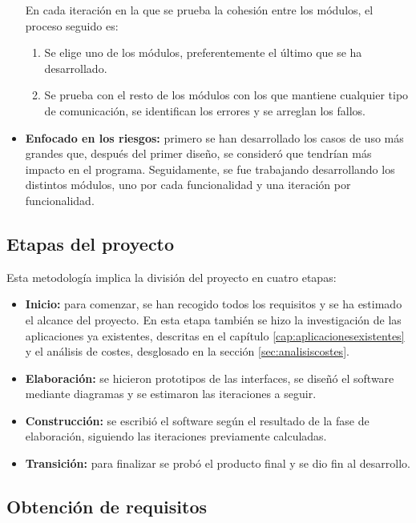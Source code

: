 \begin{itemize}
	En cada iteración en la que se prueba la cohesión entre los módulos, el proceso seguido es:
	\begin{enumerate}
		\item Se elige uno de los módulos, preferentemente el último que se ha desarrollado.
		\item Se prueba con el resto de los módulos con los que mantiene cualquier tipo de comunicación, se identifican los errores y se arreglan los fallos.
	\end{enumerate}
	
	\item \textbf{Enfocado en los riesgos:} primero se han desarrollado los casos de uso más grandes que, después del primer diseño, se consideró que tendrían más impacto en el programa. Seguidamente, se fue trabajando desarrollando los distintos módulos, uno por cada funcionalidad y una iteración por funcionalidad.
	
\end{itemize}

\subsection{Etapas del proyecto}

Esta metodología implica la división del proyecto en cuatro etapas:
\begin{itemize}
    \item \textbf{Inicio:} para comenzar, se han recogido todos los requisitos y se ha estimado el alcance del proyecto. En esta etapa también se hizo la investigación de las aplicaciones ya existentes, descritas en el capítulo \ref{cap:aplicacionesexistentes} y el análisis de costes, desglosado en la sección \ref{sec:analisiscostes}.
    \item \textbf{Elaboración:} se hicieron prototipos de las interfaces, se diseñó el software mediante diagramas y se estimaron las iteraciones a seguir.
    \item \textbf{Construcción:} se escribió el software según el resultado de la fase de elaboración, siguiendo las iteraciones previamente calculadas. 
    \item \textbf{Transición:} para finalizar se probó el producto final y se dio fin al desarrollo.
\end{itemize}

\subsection{Obtención de requisitos}
\label{sub:obtencionrequisitos}

